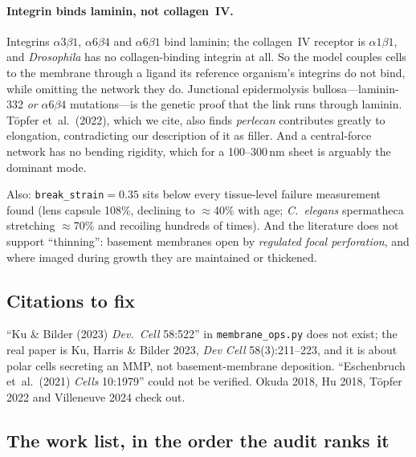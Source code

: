 \documentclass[10pt]{article}
\begin{document}
\paragraph{Integrin binds laminin, not collagen~IV.} Integrins $\alpha3\beta1$, $\alpha6\beta4$ and
$\alpha6\beta1$ bind laminin; the collagen~IV receptor is $\alpha1\beta1$, and \emph{Drosophila} has no
collagen-binding integrin at all. So the model couples cells to the membrane through a ligand its
reference organism's integrins do not bind, while omitting the network they do. Junctional epidermolysis
bullosa---laminin-332 \emph{or} $\alpha6\beta4$ mutations---is the genetic proof that the link runs
through laminin. Töpfer et~al.\ (2022), which we cite, also finds \emph{perlecan} contributes greatly to
elongation, contradicting our description of it as filler. And a central-force network has no bending
rigidity, which for a 100--300\,nm sheet is arguably the dominant mode.

Also: \texttt{break\_strain}$=0.35$ sits below every tissue-level failure measurement found (lens capsule
108\%, declining to $\approx$40\% with age; \emph{C.~elegans} spermatheca stretching $\approx$70\% and
recoiling hundreds of times). And the literature does not support ``thinning'': basement membranes open by
\emph{regulated focal perforation}, and where imaged during growth they are maintained or thickened.

\subsection*{Citations to fix}

``Ku \& Bilder (2023) \emph{Dev.\ Cell} 58:522'' in \texttt{membrane\_ops.py} does not exist; the real
paper is Ku, Harris \& Bilder 2023, \emph{Dev Cell} 58(3):211--223, and it is about polar cells secreting
an MMP, not basement-membrane deposition. ``Eschenbruch et~al.\ (2021) \emph{Cells} 10:1979'' could not be
verified. Okuda 2018, Hu 2018, Töpfer 2022 and Villeneuve 2024 check out.

\subsection*{The work list, in the order the audit ranks it}
\end{document}

